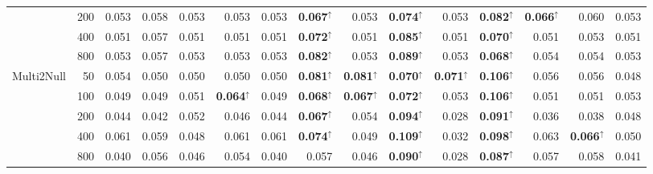 \begin{tabular}{@{}lrrrrrrrrrrrrrr@{}}
 & 200 & 0.053 & 0.058 & 0.053 & 0.053 & 0.053 & \textbf{0.067}$^{\uparrow}$ & 0.053 & \textbf{0.074}$^{\uparrow}$ & 0.053 & \textbf{0.082}$^{\uparrow}$ & \textbf{0.066}$^{\uparrow}$ & 0.060 & 0.053\\
 & 400 & 0.051 & 0.057 & 0.051 & 0.051 & 0.051 & \textbf{0.072}$^{\uparrow}$ & 0.051 & \textbf{0.085}$^{\uparrow}$ & 0.051 & \textbf{0.070}$^{\uparrow}$ & 0.051 & 0.053 & 0.051\\
 & 800 & 0.053 & 0.057 & 0.053 & 0.053 & 0.053 & \textbf{0.082}$^{\uparrow}$ & 0.053 & \textbf{0.089}$^{\uparrow}$ & 0.053 & \textbf{0.068}$^{\uparrow}$ & 0.054 & 0.054 & 0.053\\
\addlinespace[2pt]
Multi2Null & 50 & 0.054 & 0.050 & 0.050 & 0.050 & 0.050 & \textbf{0.081}$^{\uparrow}$ & \textbf{0.081}$^{\uparrow}$ & \textbf{0.070}$^{\uparrow}$ & \textbf{0.071}$^{\uparrow}$ & \textbf{0.106}$^{\uparrow}$ & 0.056 & 0.056 & 0.048\\
 & 100 & 0.049 & 0.049 & 0.051 & \textbf{0.064}$^{\uparrow}$ & 0.049 & \textbf{0.068}$^{\uparrow}$ & \textbf{0.067}$^{\uparrow}$ & \textbf{0.072}$^{\uparrow}$ & 0.053 & \textbf{0.106}$^{\uparrow}$ & 0.051 & 0.051 & 0.053\\
 & 200 & 0.044 & 0.042 & 0.052 & 0.046 & 0.044 & \textbf{0.067}$^{\uparrow}$ & 0.054 & \textbf{0.094}$^{\uparrow}$ & 0.028 & \textbf{0.091}$^{\uparrow}$ & 0.036 & 0.038 & 0.048\\
 & 400 & 0.061 & 0.059 & 0.048 & 0.061 & 0.061 & \textbf{0.074}$^{\uparrow}$ & 0.049 & \textbf{0.109}$^{\uparrow}$ & 0.032 & \textbf{0.098}$^{\uparrow}$ & 0.063 & \textbf{0.066}$^{\uparrow}$ & 0.050\\
 & 800 & 0.040 & 0.056 & 0.046 & 0.054 & 0.040 & 0.057 & 0.046 & \textbf{0.090}$^{\uparrow}$ & 0.028 & \textbf{0.087}$^{\uparrow}$ & 0.057 & 0.058 & 0.041\\
\bottomrule
\end{tabular}